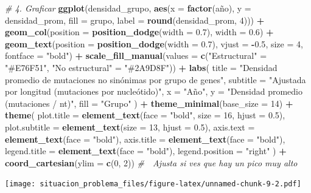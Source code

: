 \documentclass[
]{article}
\newenvironment{Shaded}{\begin{snugshade}}{\end{snugshade}}
\newcommand{\AttributeTok}[1]{\textcolor[rgb]{0.13,0.29,0.53}{#1}}
\newcommand{\CommentTok}[1]{\textcolor[rgb]{0.56,0.35,0.01}{\textit{#1}}}
\newcommand{\DecValTok}[1]{\textcolor[rgb]{0.00,0.00,0.81}{#1}}
\newcommand{\FloatTok}[1]{\textcolor[rgb]{0.00,0.00,0.81}{#1}}
\newcommand{\FunctionTok}[1]{\textcolor[rgb]{0.13,0.29,0.53}{\textbf{#1}}}
\newcommand{\NormalTok}[1]{#1}
\newcommand{\OtherTok}[1]{\textcolor[rgb]{0.56,0.35,0.01}{#1}}
\newcommand{\SpecialCharTok}[1]{\textcolor[rgb]{0.81,0.36,0.00}{\textbf{#1}}}
\newcommand{\StringTok}[1]{\textcolor[rgb]{0.31,0.60,0.02}{#1}}
\begin{document}
\begin{Shaded}
\begin{Highlighting}[]
\CommentTok{\# 4. Graficar}
\FunctionTok{ggplot}\NormalTok{(densidad\_grupo, }\FunctionTok{aes}\NormalTok{(}\AttributeTok{x =} \FunctionTok{factor}\NormalTok{(año), }\AttributeTok{y =}\NormalTok{ densidad\_prom, }\AttributeTok{fill =}\NormalTok{ grupo, }\AttributeTok{label =} \FunctionTok{round}\NormalTok{(densidad\_prom, }\DecValTok{4}\NormalTok{))) }\SpecialCharTok{+}
  \FunctionTok{geom\_col}\NormalTok{(}\AttributeTok{position =} \FunctionTok{position\_dodge}\NormalTok{(}\AttributeTok{width =} \FloatTok{0.7}\NormalTok{), }\AttributeTok{width =} \FloatTok{0.6}\NormalTok{) }\SpecialCharTok{+}
  \FunctionTok{geom\_text}\NormalTok{(}\AttributeTok{position =} \FunctionTok{position\_dodge}\NormalTok{(}\AttributeTok{width =} \FloatTok{0.7}\NormalTok{), }\AttributeTok{vjust =} \SpecialCharTok{{-}}\FloatTok{0.5}\NormalTok{, }\AttributeTok{size =} \DecValTok{4}\NormalTok{, }\AttributeTok{fontface =} \StringTok{"bold"}\NormalTok{) }\SpecialCharTok{+}
  \FunctionTok{scale\_fill\_manual}\NormalTok{(}\AttributeTok{values =} \FunctionTok{c}\NormalTok{(}\StringTok{"Estructural"} \OtherTok{=} \StringTok{"\#E76F51"}\NormalTok{, }\StringTok{"No estructural"} \OtherTok{=} \StringTok{"\#2A9D8F"}\NormalTok{)) }\SpecialCharTok{+}
  \FunctionTok{labs}\NormalTok{(}
    \AttributeTok{title =} \StringTok{"Densidad promedio de mutaciones no sinónimas por grupo de genes"}\NormalTok{,}
    \AttributeTok{subtitle =} \StringTok{"Ajustada por longitud (mutaciones por nucleótido)"}\NormalTok{,}
    \AttributeTok{x =} \StringTok{"Año"}\NormalTok{,}
    \AttributeTok{y =} \StringTok{"Densidad promedio (mutaciones / nt)"}\NormalTok{,}
    \AttributeTok{fill =} \StringTok{"Grupo"}
\NormalTok{  ) }\SpecialCharTok{+}
  \FunctionTok{theme\_minimal}\NormalTok{(}\AttributeTok{base\_size =} \DecValTok{14}\NormalTok{) }\SpecialCharTok{+}
  \FunctionTok{theme}\NormalTok{(}
    \AttributeTok{plot.title =} \FunctionTok{element\_text}\NormalTok{(}\AttributeTok{face =} \StringTok{"bold"}\NormalTok{, }\AttributeTok{size =} \DecValTok{16}\NormalTok{, }\AttributeTok{hjust =} \FloatTok{0.5}\NormalTok{),}
    \AttributeTok{plot.subtitle =} \FunctionTok{element\_text}\NormalTok{(}\AttributeTok{size =} \DecValTok{13}\NormalTok{, }\AttributeTok{hjust =} \FloatTok{0.5}\NormalTok{),}
    \AttributeTok{axis.text =} \FunctionTok{element\_text}\NormalTok{(}\AttributeTok{face =} \StringTok{"bold"}\NormalTok{),}
    \AttributeTok{axis.title =} \FunctionTok{element\_text}\NormalTok{(}\AttributeTok{face =} \StringTok{"bold"}\NormalTok{),}
    \AttributeTok{legend.title =} \FunctionTok{element\_text}\NormalTok{(}\AttributeTok{face =} \StringTok{"bold"}\NormalTok{),}
    \AttributeTok{legend.position =} \StringTok{"right"}
\NormalTok{  ) }\SpecialCharTok{+}
  \FunctionTok{coord\_cartesian}\NormalTok{(}\AttributeTok{ylim =} \FunctionTok{c}\NormalTok{(}\DecValTok{0}\NormalTok{, }\DecValTok{2}\NormalTok{))  }\CommentTok{\# 🔧 Ajusta si ves que hay un pico muy alto}
\end{Highlighting}
\end{Shaded}

\texttt{[image: situacion\_problema\_files/figure-latex/unnamed-chunk-9-2.pdf]}
\end{document}
